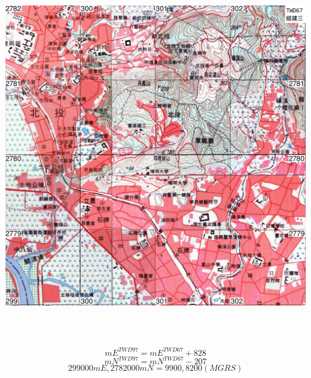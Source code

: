 \documentclass{article}
\begin{document}
\begin{multicols}{2}
\cleardoublepage

\includegraphics[width=16cm, height=16cm]{v3.png}

\begin{equation} 
	mE^{TWD97 }= mE^{TWD67} + 828 
\end{equation} 
\begin{equation} 
	mN^{TWD97 }= mN^{TWD67} - 207
\end{equation} 
\begin{equation} 
	299000mE, 2782000mN = 9900, 8200 (MGRS)	
\end{equation} 


\end{multicols}
\end{document}
